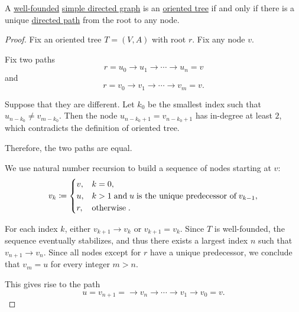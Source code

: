 \begin{proposition}\label{thm:oriented_tree_path_uniqueness}
  A \hyperref[def:well_founded_graph]{well-founded} \hyperref[def:directed_graph]{simple directed graph} is an \hyperref[def:oriented_tree]{oriented tree} if and only if there is a unique \hyperref[def:graph_walk/directed]{directed path} from the root to any node.
\end{proposition}
\begin{proof}
  \SufficiencySubProof Fix an oriented tree \( T = (V, A) \) with root \( r \). Fix any node \( v \).

  \UniquenessSubProof* Fix two paths
  \begin{equation*}
    r = u_0 \to u_1 \to \cdots \to u_n = v
  \end{equation*}
  and
  \begin{equation*}
    r = v_0 \to v_1 \to \cdots \to v_m = v.
  \end{equation*}

  Suppose that they are different. Let \( k_0 \) be the smallest index such that \( u_{n - k_0} \neq v_{m - k_0} \). Then the node \( u_{n - k_0 + 1} = v_{n - k_0 + 1} \) has in-degree at least \( 2 \), which contradicts the definition of oriented tree.

  Therefore, the two paths are equal.

  \ExistenceSubProof* We use natural number recursion to build a sequence of nodes starting at \( v \):
  \begin{equation*}
    v_k \coloneqq \begin{cases}
      v, &k = 0, \\
      u, &k > 1 \T{and} u \T{is the unique predecessor of} v_{k-1}, \\
      r, &\T{otherwise}.
    \end{cases}
  \end{equation*}

  For each index \( k \), either \( v_{k+1} \to v_k \) or \( v_{k+1} = v_k \). Since \( T \) is well-founded, the sequence eventually stabilizes, and thus there exists a largest index \( n \) such that \( v_{n+1} \to v_{n} \). Since all nodes except for \( r \) have a unique predecessor, we conclude that \( v_m = u \) for every integer \( m > n \).

  This gives rise to the path
  \begin{equation*}
    u = v_{n+1} = \to v_n \to \cdots \to v_1 \to v_0 = v.
  \end{equation*}


\end{proof}
